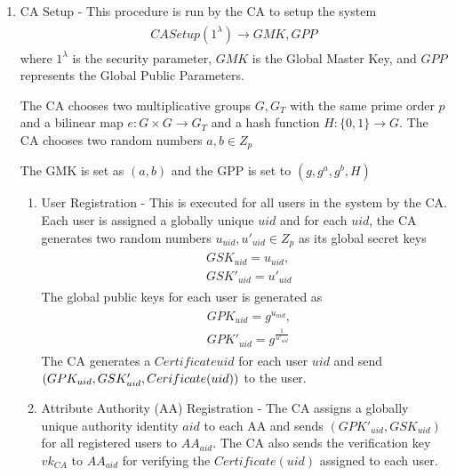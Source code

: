 \begin{enumerate}
	
	\item CA Setup - This procedure is run by the CA to setup the system
	\begin{align}
	\begin{split}
	CASetup(1^{\lambda}) \longrightarrow GMK, GPP
	\end{split}
	\end{align}
	where $ 1^{\lambda} $ is the security parameter, $ GMK $ is the Global Master Key, and $ GPP $ represents the Global Public Parameters.
	
	The CA chooses two multiplicative groups $ G, G_{T} $ with the same prime order $ p $ and a bilinear map $ e \colon G \times G \rightarrow G_{T} $ and a hash function $ H \colon \{0, 1\} \rightarrow G. $ The CA chooses two random numbers $ a, b \in Z_{p} $
	
	The GMK is set as $ (a, b) $ and the GPP is set to $ (g, g^{a}, g^{b}, H) $
	
	\begin{enumerate}
		
		\item User Registration - This is executed for all users in the system by the CA. Each user is assigned a globally unique $ uid $ and for each $ uid $, the CA generates two random numbers $ u_{uid}, u'_{uid} \in Z_{p} $ as its global secret keys
		\begin{align}
		\begin{split}
		&GSK_{uid} = u_{uid}, \\ &GSK'_{uid} = u'_{uid}
		\end{split}
		\end{align}
		The global public keys for each user is generated as 
		\begin{align}
		\begin{split}
		&GPK_{uid} = g^{u_{uid}}, \\ &GPK'_{uid} = g^{\frac{1}{u'_{uid}}}
		\end{split}
		\end{align}
		The CA generates a $ Certificate{uid} $ for each user $ uid $ and send $ (GPK_{uid}, GSK'_{uid}, \\ Cerificate(uid)) $ to the user.
		
		\item Attribute Authority (AA) Registration - The CA assigns a globally unique authority identity $ aid $ to each AA and sends $ (GPK'_{uid}, GSK_{uid}) $ for all registered users to $ AA_{aid} $. The CA also sends the verification key $ vk_{CA} $ to $ AA_{aid} $ for verifying the $ Certificate(uid) $ assigned to each user.
		

\end{enumerate}
\end{enumerate}
